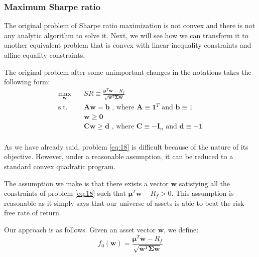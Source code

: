 \documentclass{beamer}
\begin{document}
\begin{frame}


\frametitle{\textbf{Maximum Sharpe ratio}}

\justifying
The original problem of Sharpe ratio maximization is not convex and there is not any analytic algorithm to solve it. Next, we will see how we can transform it to another equivalent problem that is convex with linear inequality constraints and affine equality constraints.

\vspace{0.8cm}
\justifying
The original problem after some unimportant changes in the notations takes the following form:
\justifying
\begin{equation}
\begin{aligned}
\label{eq:18}
\max_{\mathbf{w}} \quad & SR \equiv \frac{\boldsymbol\mu^{T} \mathbf{w} - R_{f}}{\sqrt{\mathbf{w}^{T}\mathbf{\Sigma}\mathbf{w}}} \\
\textrm{s.t.} \quad & \mathbf{A} \mathbf{w} = \mathbf{b} \textrm{ , where } \mathbf{A} \equiv \mathbf{1}^{T} \textrm{ and } \mathbf{b} \equiv 1  \\
                             & \mathbf{w} \geq \mathbf{0} \\
                             & \mathbf{C}\mathbf{w} \geq \mathbf{d} \textrm{ , where } \mathbf{C} \equiv -\mathbf{I}_{n} \textrm{ and } \mathbf{d} \equiv -\mathbf{1}  \\
\end{aligned}
\end{equation}

\end{frame}




\begin{frame}

\justifying
As we have already said, problem \eqref{eq:18} is difficult because of the nature of its objective. However, under a reasonable assumption, it can be reduced to a standard convex quadratic program.

\vspace{0.8cm}
\justifying
The assumption we make is that there exists a vector $\mathbf{w}$ satisfying all the constraints of problem \eqref{eq:18} such that $\boldsymbol\mu^{T} \mathbf{w} - R_{f} > 0$. This assumption is reasonable as it simply says that our universe of assets is able to beat the risk-free rate of return.

\vspace{0.8cm}
\justifying
Our approach is as follows. Given an asset vector $\mathbf{w}$, we define:
$$
f_{0}\left(\mathbf{w}\right) =  \frac{\boldsymbol\mu^{T} \mathbf{w} - R_{f}}{\sqrt{\mathbf{w}^{T}\mathbf{\Sigma}\mathbf{w}}}
$$

\end{frame}
\end{document}
